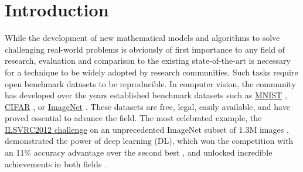 \documentclass{article}
\begin{document}
\section{Introduction} %


While the development of new mathematical models and algorithms to solve challenging real-world problems is obviously of first importance to any field of research, evaluation and comparison to the existing state-of-the-art is necessary for a technique to be widely adopted by research communities. Such tasks require open benchmark datasets to be reproducible. %
In computer vision, the community has developed over the years established benchmark datasets such as \href{http://yann.lecun.com/exdb/mnist/}{MNIST} \cite{mnist}, \href{https://www.cs.toronto.edu/~kriz/cifar.html}{CIFAR} \cite{cifar}, or \href{http://www.image-net.org}{ImageNet} \cite{imagenet}. These datasets are free, legal, easily available, and have proved essential to advance the field. The most celebrated example, the \href{http://www.image-net.org/challenges/LSVRC/2012/}{ILSVRC2012 challenge} on an unprecedented ImageNet subset of 1.3M images \cite{imagenet_challenge}, demonstrated the power of deep learning (DL), which won the competition with an 11\% accuracy advantage over the second best \cite{convnet_imagenet}, and unlocked incredible achievements in both fields \cite{dl}.
\end{document}
